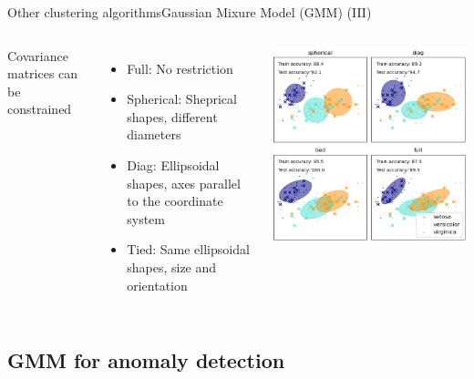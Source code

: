 \documentclass[10pt,compress]{beamer} %
\begin{document}
\begin{frame}{Other clustering algorithms}{Gaussian Mixure Model (GMM) (III)}
    \begin{columns}
            Covariance matrices can be constrained
            \begin{itemize}
                \item Full: No restriction
                \item Spherical: Sheprical shapes, different diameters
                \item Diag: Ellipsoidal shapes, axes parallel to the coordinate system
                \item Tied: Same ellipsoidal shapes, size and orientation
            \end{itemize}

	        \includegraphics[width=\textwidth]{figs/gmm-covariances.png}
    \end{columns}
\end{frame}

\subsection{GMM for anomaly detection}
\end{document}
